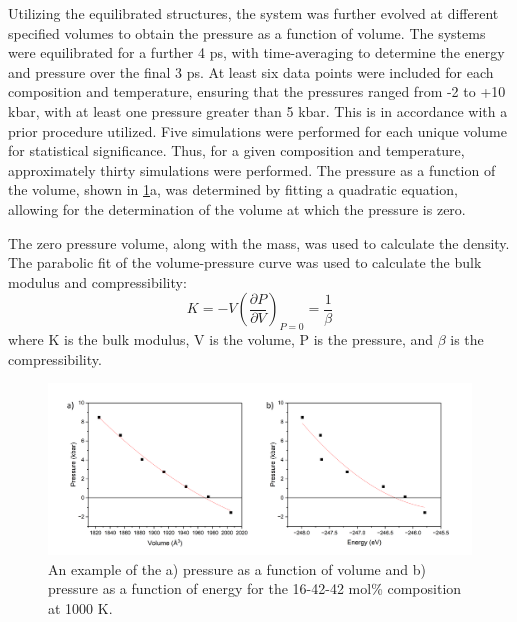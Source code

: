 \documentclass[preprint,12pt]{elsarticle}
\begin{document}
Utilizing the equilibrated structures, the system was further evolved at different specified volumes to obtain the pressure as a function of volume. The systems were equilibrated for a further 4 ps, with time-averaging to determine the energy and pressure over the final 3 ps. At least six data points were included for each composition and temperature, ensuring that the pressures ranged from -2 to +10 kbar, with at least one pressure greater than 5 kbar. This is in accordance with a prior procedure utilized\cite{Duemmler2022}. Five simulations were performed for each unique volume for statistical significance. Thus, for a given composition and temperature, approximately thirty simulations were performed. The pressure as a function of the volume, shown in \cref{fig:PV_PE}a, was determined by fitting a quadratic equation, allowing for the determination of the volume at which the pressure is zero. 

The zero pressure volume, along with the mass, was used to calculate the density. The parabolic fit of the volume-pressure curve was used to calculate the bulk modulus and compressibility:
\begin{equation}\label{eq:bulk}
K = -V\left(\frac{\partial{P}}{\partial{V}}\right)_{P=0}= \frac{1}{\beta}
\end{equation}
\noindent where K is the bulk modulus, V is the volume, P is the pressure, and $\beta$ is the compressibility. 

\begin{figure}[!h]
\centering
\includegraphics[width=\textwidth]{pv_pe_fixed.png}
\caption{An example of the a) pressure as a function of volume and b) pressure as a function of energy for the 16-42-42 mol\% composition at 1000 K.}
\label{fig:PV_PE}
\end{figure}
\FloatBarrier
\end{document}
